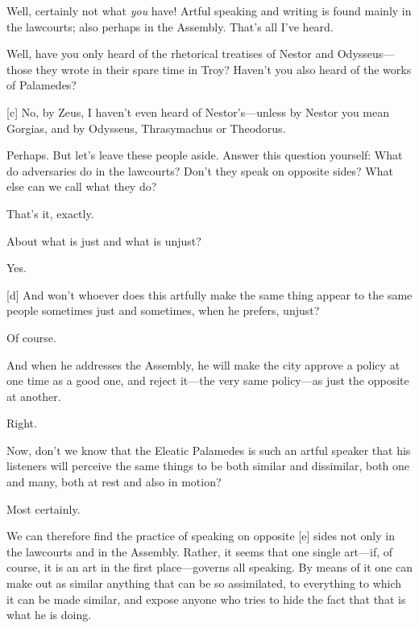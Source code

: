 \sayphaedrus Well, certainly not what {\em you} have! Artful speaking and
writing is found mainly in the lawcourts; also perhaps in the Assembly.
That's all I've heard.

\saysocrates Well, have you only heard of the rhetorical treatises of
Nestor and Odysseus---those they wrote in their spare time in Troy?
Haven't you also heard of the works of
Palamedes?

{[}c{]} \sayphaedrus No, by Zeus, I haven't even heard of Nestor's---unless
by Nestor you mean Gorgias, and by Odysseus, Thrasymachus or
Theodorus.

\saysocrates Perhaps. But let's leave these people aside. Answer this
question yourself: What do adversaries do in the lawcourts? Don't they
speak on opposite sides? What else can we call what they do?

\sayphaedrus That's it, exactly.

\saysocrates About what is just and what is unjust?

\sayphaedrus Yes.

{[}d{]} \saysocrates And won't whoever does this artfully make the same
thing appear to the same people sometimes just and sometimes, when he
prefers, unjust?

\sayphaedrus Of course.

\saysocrates And when he addresses the Assembly, he will make the city
approve a policy at one time as a good one, and reject it---the very
same policy---as just the opposite at another.

\sayphaedrus Right.

\saysocrates Now, don't we know that the Eleatic Palamedes is such an
artful speaker that his listeners will perceive the same things to be
both similar and dissimilar, both one and many, both at rest and also in
motion?

\sayphaedrus Most certainly.

\saysocrates We can therefore find the practice of speaking on opposite
{[}e{]} sides not only in the lawcourts and in the Assembly. Rather, it
seems that one single art---if, of course, it is an art in the first
place---governs all speaking. By means of it one can make out as similar
anything that can be so assimilated, to everything to which it can be
made similar, and expose anyone who tries to hide the fact that that is
what he is doing.

